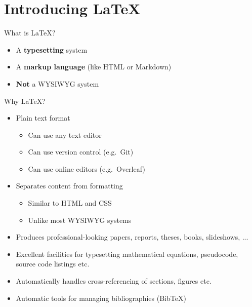 \part{Introducing LaTeX}
\frame{\partpage}

\begin{frame}{What is LaTeX?}
\begin{itemize}
	\pause\item A \textbf{typesetting} system
	\pause\item A \textbf{markup language} (like HTML or Markdown)
	\pause\item \textbf{Not} a WYSIWYG system
\end{itemize}
\end{frame}

\begin{frame}{Why LaTeX?}
\begin{itemize}
	\pause\item Plain text format
	\begin{itemize}
		\pause\item Can use any text editor
		\pause\item Can use version control (e.g.\ Git)
		\pause\item Can use online editors (e.g.\ Overleaf)
	\end{itemize}
	\pause\item Separates content from formatting
	\begin{itemize}
		\pause\item Similar to HTML and CSS
		\pause\item Unlike most WYSIWYG systems
	\end{itemize}
	\pause\item Produces professional-looking papers, reports, theses, books, slideshows, ...
	\pause\item Excellent facilities for typesetting mathematical equations, pseudocode, source code listings etc.
	\pause\item Automatically handles cross-referencing of sections, figures etc.
	\pause\item Automatic tools for managing bibliographies (BibTeX)
\end{itemize}
\end{frame}

